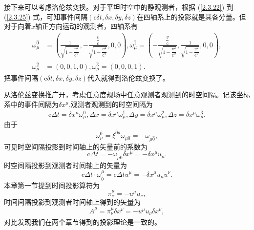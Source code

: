 \documentclass[11pt, a4paper, oneside, onecolumn]{ctexart}
\numberwithin{equation}{subsection}
\begin{document}
接下来可以考虑洛伦兹变换。对于平坦时空中的静观测者，根据 (\ref{2.3.22}) 到 (\ref{2.3.25}) 式，可知事件间隔$\left(\mathrm{c}\delta{}t,\delta{}x,\delta{}y,\delta{}z\right)$在四轴系上的投影就是其各分量。但对于向着$x$轴正方向运动的观测者，四轴系有
\begin{align}
\omega^{\hat{0}}_{\mu}&=\left(\frac{1}{\sqrt{1-\dfrac{v^{2}}{\mathrm{c}^{2}}}},-\frac{\dfrac{v}{\mathrm{c}}}{\sqrt{1-\dfrac{v^{2}}{\mathrm{c}^{2}}}},0,0\right),\omega^{\hat{1}}_{\mu}=\left(-\frac{\dfrac{v}{\mathrm{c}}}{\sqrt{1-\dfrac{v^{2}}{\mathrm{c}^{2}}}},\frac{1}{\sqrt{1-\dfrac{v^{2}}{\mathrm{c}^{2}}}},0,0\right),\\
\omega^{\hat{2}}_{\mu}&=\left(0,0,1,0\right),\omega^{\hat{3}}_{\mu}=\left(0,0,0,1\right).
\end{align}
把事件间隔$\left(\mathrm{c}\delta{}t,\delta{}x,\delta{}y,\delta{}z\right)$代入就得到洛伦兹变换了。

从洛伦兹变换推广开，考虑任意度规场中任意观测者观测到的时空间隔。记该坐标系中的事件间隔为$\delta{}x^{\mu}$,观测者观测到的时空间隔为
\begin{equation}
\mathrm{c}\Delta{}t=\delta{}x^{\mu}\omega_{\mu}^{\hat{0}},\Delta{}x=\delta{}x^{\mu}\omega_{\mu}^{\hat{1}},\Delta{}y=\delta{}x^{\mu}\omega_{\mu}^{\hat{2}},\Delta{}z=\delta{}x^{\mu}\omega_{\mu}^{\hat{3}}.
\end{equation}
由于
\begin{equation}
\omega_{\mu}^{\hat{0}}=\xi^{\hat{0}\hat{a}}\omega_{\mu\hat{a}}=-\omega_{\mu\hat{0}},
\end{equation}
可见时空间隔投影到时间轴上的矢量前的系数为
\begin{equation}
\mathrm{c}\Delta{}t=-\omega_{\mu\hat{0}}\delta{}x^{\mu}=-\delta{}x^{\mu}u_{\mu}.
\end{equation}
时空间隔投影到观测者时间轴上的矢量为
\begin{equation}
\mathrm{c}\Delta{}t\cdot\omega^{\mu}_{\hat{0}}=\mathrm{c}\Delta{}tu^{\mu}=-\delta{}x^{\mu}u_{\mu}u^{\nu}.
\end{equation}
本章第一节提到时间投影算符为
\begin{equation}
\pi^{\mu}_{\nu}=-u^{\mu}u_{\nu},
\end{equation}
时间间隔投影到观测者时间轴上得到的矢量为
\begin{equation}
A^{\mu}_{\parallel}=\pi^{\mu}_{\nu}\delta{}x^{\nu}=-u^{\mu}u_{\nu}\delta{}x^{\nu},
\end{equation}
对比发现我们在两个章节得到的投影理论是一致的。
\end{document}
